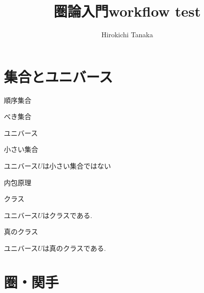 \documentclass{jsbook}
\title{圏論入門workflow test}
\author{Hirokichi Tanaka}
\theoremstyle{plain}
\begin{document}
\maketitle

\tableofcontents
\newpage
\chapter{集合とユニバース}
\begin{Def}
順序集合
\end{Def}
\begin{Def}
べき集合
\end{Def}
\begin{Def}
ユニバース
\end{Def}
\begin{Def}
小さい集合
\end{Def}
\begin{Prop}
ユニバース$U$は小さい集合ではない
\end{Prop}
内包原理

\begin{Def}
クラス
\end{Def}
\begin{Prop}
ユニバース$U$はクラスである.
\end{Prop}
\begin{Def}
真のクラス
\end{Def}
\begin{Prop}
ユニバース$U$は真のクラスである.
\end{Prop}
\chapter{圏・関手}
\end{document}
